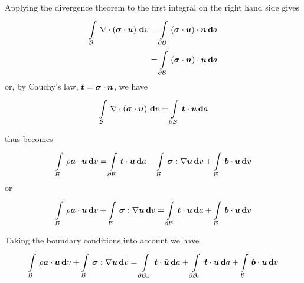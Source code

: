 Applying the divergence theorem to the first integral on the right hand side
gives
\begin{equation}
  \begin{split}
    \gint{\embedmanifold{B}}{}{\divergence{}{\pbrac{\dotprod{\tensor{\sigma}}{\vectr{u}}}}}{v}
    &=\gint{\boundary{\embedmanifold{B}}}{}{\dotprod{\pbrac{\dotprod{\tensor{\sigma}}{\vectr{u}}}}{\vectr{n}}}{a}\\
    &=\gint{\boundary{\embedmanifold{B}}}{}{\dotprod{\pbrac{\dotprod{\tensor{\sigma}}{\vectr{n}}}}{\vectr{u}}}{a}
  \end{split}
\end{equation}
or, by Cauchy's law, $\boldsymbol{t}=\boldsymbol{\mathit{\sigma}}\cdot\boldsymbol{n}$, we have
\begin{equation}
  \gint{\embedmanifold{B}}{}{\divergence{}{\pbrac{\dotprod{\tensor{\sigma}}{\vectr{u}}}}}{v}=
  \gint{\boundary{\embedmanifold{B}}}{}{\dotprod{\vectr{t}}{\vectr{u}}}{a}
\end{equation}

 thus becomes
\begin{equation}
  \gint{\embedmanifold{B}}{}{\dotprod{\rho\vectr{a}}{\vectr{u}}}{v}=
  \gint{\boundary{\embedmanifold{B}}}{}{\dotprod{\vectr{t}}{\vectr{u}}}{a}-
  \gint{\embedmanifold{B}}{}{\doubledotprod{\tensor{\sigma}}{\gradient{}{\vectr{u}}}}{v}+
  \gint{\embedmanifold{B}}{}{\dotprod{\vectr{b}}{\vectr{u}}}{v}
\end{equation}
or
\begin{equation}
  \gint{\embedmanifold{B}}{}{\dotprod{\rho\vectr{a}}{\vectr{u}}}{v}+
  \gint{\embedmanifold{B}}{}{\doubledotprod{\tensor{\sigma}}{\gradient{}{\vectr{u}}}}{v}=
  \gint{\boundary{\embedmanifold{B}}}{}{\dotprod{\vectr{t}}{\vectr{u}}}{a}+
  \gint{\embedmanifold{B}}{}{\dotprod{\vectr{b}}{\vectr{u}}}{v}
\end{equation}

Taking the boundary conditions into account we have
\begin{equation}
  \gint{\embedmanifold{B}}{}{\dotprod{\rho\vectr{a}}{\vectr{u}}}{v}+
  \gint{\embedmanifold{B}}{}{\doubledotprod{\tensor{\sigma}}{\gradient{}{\vectr{u}}}}{v}=
  \gint{\boundary{\embedmanifold{B}}_{u}}{}{\dotprod{\vectr{t}}{\bar{\vectr{u}}}}{a}+
  \gint{\boundary{\embedmanifold{B}}_{t}}{}{\dotprod{\bar{\vectr{t}}}{\vectr{u}}}{a}+
  \gint{\embedmanifold{B}}{}{\dotprod{\vectr{b}}{\vectr{u}}}{v}
  \label{eqn:virtualworkdisp1}
\end{equation}

